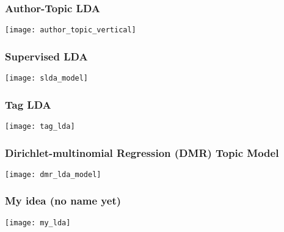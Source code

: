\documentclass{beamer}
\begin{document}
\begin{frame}
  \frametitle{Author-Topic LDA}
  \begin{center}
	\texttt{[image: author\_topic\_vertical]}
  \end{center}
\end{frame}

\begin{frame}
  \frametitle{Supervised LDA}
  \begin{center}
	\texttt{[image: slda\_model]}
  \end{center}
\end{frame}

\begin{frame}
  \frametitle{Tag LDA}
  \begin{center}
	\texttt{[image: tag\_lda]}
  \end{center}
\end{frame}


\begin{frame}
  \frametitle{Dirichlet-multinomial Regression (DMR) Topic Model}
  \begin{center}
	\texttt{[image: dmr\_lda\_model]}
  \end{center}
\end{frame}

\begin{frame}
  \frametitle{My idea (no name yet)}
  \begin{center}
	\texttt{[image: my\_lda]}
  \end{center}
\end{frame}
\end{document}
